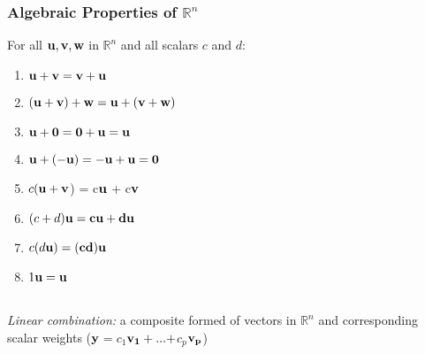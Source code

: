 \documentclass[12pt]{article} %
\newcommand{\R}{\mathbb{R}}
\begin{document}
\subsubsection{Algebraic Properties of $\R^n$}
For all $\bf{u}, \bf{v}, \bf{w}$ in $\R^n$ and all scalars $c$ and $d$:
\begin{enumerate}
	\item $\bf{u} + \bf{v} = \bf{v} + \bf{u}$
	\item $(\bf{u + v) + w = u + (v + w)}$
	\item $\bf{u + 0 = 0 + u = u}$
	\item $\bf{u + (-u) = -u + u = 0}$
	\item $c(\bf{u + v}$) = c$\bf{u}$ + c$\bf{v}$
	\item $(c + d)\bf{u} = c\bf{u} + d\bf{u}$
	\item $c(d\bf{u}) = (cd)\bf{u}$
	\item $1\bf{u = u}$
\end{enumerate}
\leavevmode \\
\emph{Linear combination:} a composite formed of vectors in $\R^n$ and corresponding scalar weights ($\bf{y}$$=c_1$$\bf{v_1+ ... + }$$c_p$$\bf{v_p}$)
\end{document}
